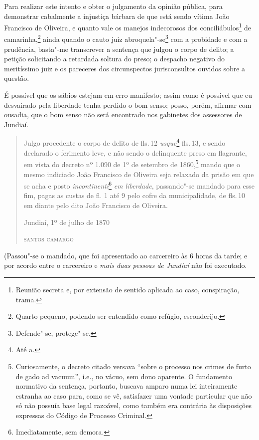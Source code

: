 Para realizar este intento e obter o julgamento da opinião pública, para
demonstrar cabalmente a injustiça bárbara de que está sendo vítima João
Francisco de Oliveira, e quanto vale os manejos indecorosos dos
conciliábulos\footnote{Reunião secreta e, por extensão de sentido
  aplicada ao caso, conspiração, trama.} de camarinha,\footnote{Quarto
  pequeno, podendo ser entendido como refúgio, esconderijo.} ainda
quando o cauto juiz abroquela"-se\footnote{Defende"-se, protege"-se.} com
a probidade e com a prudência, basta"-me transcrever a sentença que
julgou o corpo de delito; a petição solicitando a retardada soltura do
preso; o despacho negativo do meritíssimo juiz e os pareceres dos
circunspectos jurisconsultos ouvidos sobre a questão.

É possível que os sábios estejam em erro manifesto; assim como é
possível que eu desvairado pela liberdade tenha perdido o bom senso;
posso, porém, afirmar com ousadia, que o bom senso não será encontrado
nos gabinetes dos assessores de Jundiaí.

\asterisc

\begin{quote}
Julgo procedente o corpo de delito de fls.\,12 \emph{usque}\footnote{Até a.} fls.\,13, e sendo declarado o ferimento leve, e não sendo o
delinquente preso em flagrante, em vista do decreto nº 1.090 de 1º de
setembro de 1860,\footnote{Curiosamente, o decreto citado versava
  ``sobre o processo nos crimes de furto de gado ad vacuum'', i.e., no
  vácuo, sem dono aparente. O fundamento normativo da sentença,
  portanto, buscava amparo numa lei inteiramente estranha ao caso para,
  como se vê, satisfazer uma vontade particular que não só não possuía
  base legal razoável, como também era contrária às disposições expressas
  do Código de Processo Criminal.} mando que o mesmo indiciado João
Francisco de Oliveira seja relaxado da prisão em que se acha e posto
\emph{incontinenti}\footnote{Imediatamente, sem demora.} \emph{em
liberdade}, passando"-se mandado para esse fim, pagas as custas de fl. 1
até 9 pelo cofre da municipalidade, de fls.\,10 em diante pelo dito João
Francisco de Oliveira.

\medskip

\noindent{}Jundiaí, 1º de julho de 1870\smallskip

\noindent\textsc{santos camargo}
\end{quote}

\noindent(Passou"-se o mandado, que foi apresentado ao carcereiro às 6 horas da
tarde; e por acordo entre o carcereiro e \emph{mais duas pessoas de
Jundiaí} não foi executado.

